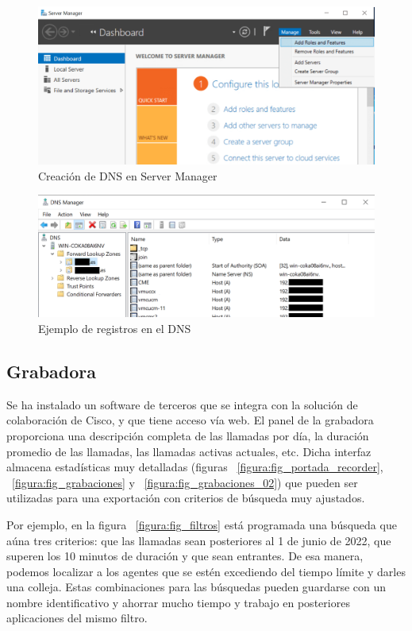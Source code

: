 \documentclass[a4paper, 12pt]{book}
\begin{document}
\begin{figure}
  \centering
  \includegraphics[scale=0.85]{img/fig_dns}
  \caption{Creación de DNS en Server Manager}
  \label{figura:fig_dns}
\end{figure}

\begin{figure}
  \centering
  \includegraphics[scale=0.8]{img/fig_dominios}
  \caption{Ejemplo de registros en el DNS}
  \label{figura:fig_dominios}
\end{figure}

\subsection{Grabadora}
\label{sec:grabadora}
Se ha instalado un software de terceros que se integra con la solución de colaboración de Cisco, y que tiene acceso vía web. El panel de la grabadora proporciona una descripción completa de las llamadas por día, la duración promedio de las llamadas, las llamadas activas actuales, etc. Dicha interfaz almacena estadísticas muy detalladas (figuras ~\ref{figura:fig_portada_recorder}, ~\ref{figura:fig_grabaciones} y ~\ref{figura:fig_grabaciones_02}) que pueden ser utilizadas para una exportación con criterios de búsqueda muy ajustados.

Por ejemplo, en la figura ~\ref{figura:fig_filtros} está programada una búsqueda que aúna tres criterios: que las llamadas sean posteriores al 1 de junio de 2022, que superen los 10 minutos de duración y que sean entrantes. 
De esa manera, podemos localizar a los agentes que se estén excediendo del tiempo límite y darles una colleja.
Estas combinaciones para las búsquedas pueden guardarse con un nombre identificativo y ahorrar mucho tiempo y trabajo en posteriores aplicaciones del mismo filtro.
\end{document}

